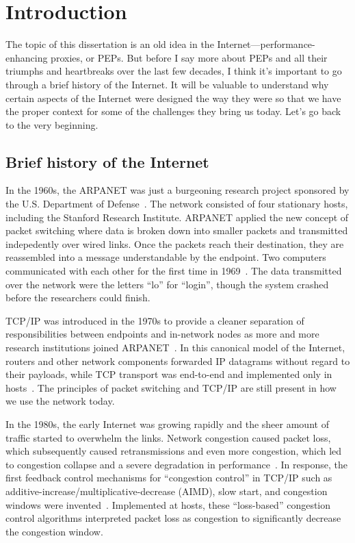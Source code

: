 \chapter{Introduction}
\label{sec:introduction}

The topic of this dissertation is an old idea in the
Internet---performance-enhancing proxies, or PEPs. But before I say more about
PEPs and all their triumphs and heartbreaks over the last few decades, I think
it's important to go through a brief history of the Internet. It will be
valuable to understand why certain aspects of the Internet were designed the
way they were so that we have the proper context for some of the challenges
they bring us today. Let's go back to the very beginning.

\section{Brief history of the Internet}

In the 1960s, the ARPANET was just a burgeoning research project sponsored by
the U.S. Department of Defense~\cite{hauben1997history}. The network consisted
of four stationary hosts,
including the Stanford Research Institute. ARPANET applied the new concept
of packet switching where data is broken down into smaller packets and
transmitted indepedently over wired links. Once the packets reach their
destination, they are reassembled into a message understandable by the
endpoint. Two computers communicated with each other for the first time in
1969~\cite{arpanet2019}. The data transmitted over the network were the letters ``lo'' for
``login'', though the system crashed before the researchers could finish.

TCP/IP was introduced in the 1970s to provide a cleaner separation of
responsibilities between endpoints and in-network nodes as more and more
research institutions joined ARPANET~\cite{rfc675}. In this canonical model of
the Internet,
routers and other network components forwarded IP datagrams without regard to
their payloads, while TCP transport was end-to-end and implemented only in
hosts~\cite{saltzer1984endtoend,clark1988darpa}. The principles of packet
switching and TCP/IP are still present in how we use the network today.

In the 1980s, the early Internet was growing rapidly and the sheer amount of
traffic started to overwhelm the links. Network congestion caused packet loss,
which subsequently caused retransmissions and even more congestion, which led
to congestion collapse and a severe degradation in performance~\cite{rfc896}.
In response, the first feedback control mechanisms for ``congestion control''
in TCP/IP such as additive-increase/multiplicative-decrease (AIMD), slow start,
and congestion windows were invented~\cite{vjk,chiu1989analysis}. Implemented
at hosts, these
``loss-based'' congestion control algorithms interpreted packet loss as
congestion to significantly decrease the congestion window.

